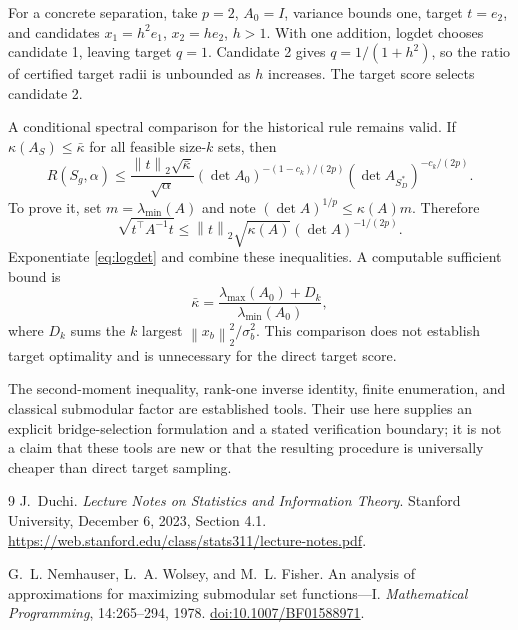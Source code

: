 \documentclass[11pt]{article}
\theoremstyle{remark}
\newcommand{\norm}[1]{\left\lVert #1\right\rVert_2}
\begin{document}
For a concrete separation, take $p=2$, $A_0=I$, variance bounds one, target $t=e_2$, and candidates $x_1=h^2e_1$, $x_2=he_2$, $h>1$. With one addition, logdet chooses candidate 1, leaving target $q=1$. Candidate 2 gives $q=1/(1+h^2)$, so the ratio of certified target radii is unbounded as $h$ increases. The target score selects candidate 2.

A conditional spectral comparison for the historical rule remains valid. If
$\kappa(A_S)\le\bar\kappa$ for all feasible size-$k$ sets, then
\[
 R(S_g,\alpha)\le
 \frac{\norm{t}\sqrt{\bar\kappa}}{\sqrt\alpha}
 (\det A_0)^{-(1-c_k)/(2p)}
 (\det A_{S_D^*})^{-c_k/(2p)}.
\]
To prove it, set $m=\lambda_{\min}(A)$ and note
$(\det A)^{1/p}\le\kappa(A)m$. Therefore
\[
 \sqrt{t^\top A^{-1}t}
 \le\norm{t}\sqrt{\kappa(A)}(\det A)^{-1/(2p)}.
\]
Exponentiate \eqref{eq:logdet} and combine these inequalities.
A computable sufficient bound is
\[
 \bar\kappa=\frac{\lambda_{\max}(A_0)+D_k}{\lambda_{\min}(A_0)},
\]
where $D_k$ sums the $k$ largest $\norm{x_b}^2/\sigma_b^2$.
This comparison does not establish target optimality and is unnecessary for the direct target score.

The second-moment inequality, rank-one inverse identity, finite enumeration, and classical submodular factor are established tools. Their use here supplies an explicit bridge-selection formulation and a stated verification boundary; it is not a claim that these tools are new or that the resulting procedure is universally cheaper than direct target sampling.

\begin{thebibliography}{9}
J.~Duchi.
\newblock \emph{Lecture Notes on Statistics and Information Theory}.
\newblock Stanford University, December 6, 2023, Section 4.1.
\newblock \url{https://web.stanford.edu/class/stats311/lecture-notes.pdf}.

G.~L. Nemhauser, L.~A. Wolsey, and M.~L. Fisher.
\newblock An analysis of approximations for maximizing submodular set functions---I.
\newblock \emph{Mathematical Programming}, 14:265--294, 1978.
\newblock \href{https://doi.org/10.1007/BF01588971}{doi:10.1007/BF01588971}.
\end{thebibliography}
\end{document}
